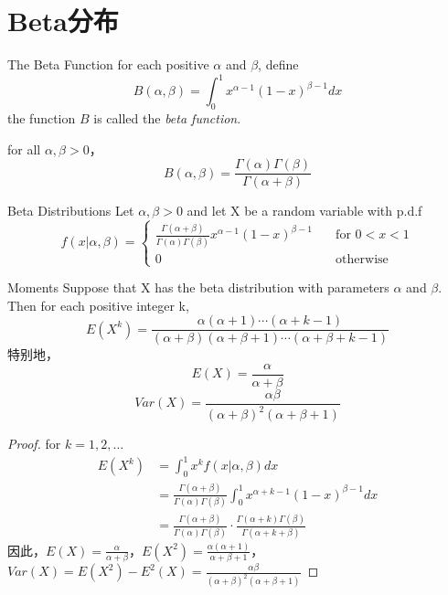 \documentclass[../../main.tex]{subfiles}
\begin{document}
\section{Beta分布}
\begin{definition}{The Beta Function}{}
for each positive $\alpha$ and $\beta$, define
\begin{equation}\label{}
B(\alpha, \beta)=\int_{0}^{1} x^{\alpha-1}(1-x)^{\beta-1}dx
\end{equation}
the function $B$ is called the \textit{beta function}.
\end{definition}

\begin{theorem}{}{}
for all $\alpha, \beta > 0$，
\begin{equation}\label{}
B(\alpha, \beta)=\frac{\Gamma(\alpha)\Gamma(\beta)}{\Gamma(\alpha+\beta)}
\end{equation}
\end{theorem}


\begin{definition}{Beta Distributions}{}
Let $\alpha, \beta>0$ and let X be a random variable with p.d.f
\begin{equation}\label{}
f(x|\alpha,\beta)=\begin{cases}
\frac{\Gamma(\alpha+\beta)}{\Gamma(\alpha)\Gamma(\beta)} x^{\alpha-1}(1-x)^{\beta-1}\quad &\text{for $0<x<1$}\\
0\quad &\text{otherwise}
\end{cases}
\end{equation}
\end{definition}

\begin{theorem}{Moments}{}
Suppose that X has the beta distribution with parameters $\alpha$ and $\beta$. Then for each positive integer k,
\begin{equation}\label{}
E(X^k)=\frac{\alpha(\alpha+1)\cdots(\alpha+k-1)}{(\alpha+\beta)(\alpha+\beta+1)\cdots(\alpha+\beta+k-1)}
\end{equation}
特别地，
\begin{equation}\label{}
E(X)=\frac{\alpha}{\alpha+\beta}
\end{equation}
\begin{equation}\label{}
Var(X)=\frac{\alpha\beta}{(\alpha+\beta)^2(\alpha+\beta+1)}
\end{equation}
\end{theorem}
\begin{proof}
for $k=1, 2, \dots$
\begin{equation}\label{}
\begin{split}
E(X^k)&=\int_{0}^{1} x^kf(x|\alpha, \beta)dx\\
&=\frac{\Gamma(\alpha+\beta)}{\Gamma(\alpha)\Gamma(\beta)} \int_{0}^{1}x^{\alpha+k-1}(1-x)^{\beta-1}dx\\
&=\frac{\Gamma(\alpha+\beta)}{\Gamma(\alpha)\Gamma(\beta)} \cdot \frac{\Gamma(\alpha+k)\Gamma(\beta)}{\Gamma(\alpha+k+\beta)}
\end{split}
\end{equation}
因此，$E(X)=\frac{\alpha}{\alpha+\beta}$，$E(X^2)=\frac{\alpha(\alpha+1)}{\alpha+\beta+1}$，$Var(X)=E(X^2)-E^2(X)=\frac{\alpha\beta}{(\alpha+\beta)^2(\alpha+\beta+1)}$
\end{proof}
\end{document}
